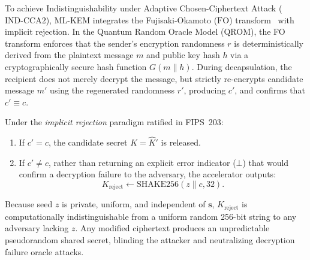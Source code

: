 To achieve Indistinguishability under Adaptive Chosen-Ciphertext Attack ($\text{IND-CCA2}$), \mbox{ML-KEM} integrates the Fujisaki-Okamoto ($\text{FO}$) transform~\cite{fo1999} with implicit rejection. In the Quantum Random Oracle Model (QROM), the FO transform enforces that the sender's encryption randomness $r$ is deterministically derived from the plaintext message $m$ and public key hash $h$ via a cryptographically secure hash function $G(m \parallel h)$. During decapsulation, the recipient does not merely decrypt the message, but strictly re-encrypts candidate message $m'$ using the regenerated randomness $r'$, producing $c'$, and confirms that $c' \equiv c$.

Under the \textit{implicit rejection} paradigm ratified in FIPS~203:
\begin{enumerate}
    \item If $c' = c$, the candidate secret $K = \hat{K}'$ is released.
    \item If $c' \neq c$, rather than returning an explicit error indicator ($\bot$) that would confirm a decryption failure to the adversary, the accelerator outputs:
    \begin{equation}
    \label{eq:implicit_rejection_key}
    K_{\text{reject}} \leftarrow \text{SHAKE256}(z \parallel c, 32).
    \end{equation}
\end{enumerate}
Because seed $z$ is private, uniform, and independent of $\mathbf{s}$, $K_{\text{reject}}$ is computationally indistinguishable from a uniform random 256-bit string to any adversary lacking $z$. Any modified ciphertext produces an unpredictable pseudorandom shared secret, blinding the attacker and neutralizing decryption failure oracle attacks.

